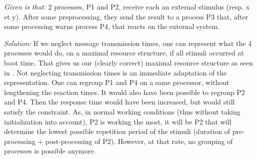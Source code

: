 \begin{exmp}
\emph{Given is that:} 2 processes, P1 and P2, receive each an external stimulus (resp. x et y). After some preprocessing, they send the result to a process P3 that, after some processing warns process P4, that reacts on the external system. %

\emph{Solution:} If we neglect message transmission times, one can represent what the 4 processes would do, on a maximal resource structure, if all stimuli occurred at boot time.
That gives us our (clearly correct) maximal resource structure as seen in .
Not neglecting transmission times is an immediate adaptation of the representation. One can regroup P1 and P4 on a same processor, without lengthening the reaction times. It would also have been possible to regroup P2 and P4. Then the response time would have been increased, but would still satisfy the constraint.
As, in normal working conditions (thus without taking initialization into account), P2 is working the most, it will be P2 that will determine the lowest possible repetition period of the stimuli (duration of pre-processing + post-processing of P2). However, at that rate, no grouping of processes is possible anymore.



\end{exmp}





